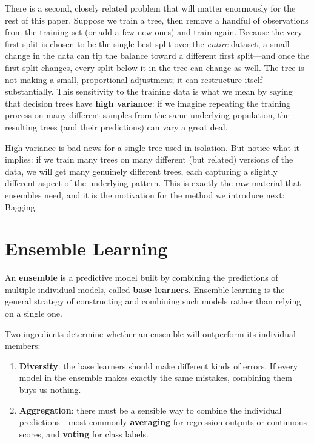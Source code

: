 \documentclass[12pt,a4paper]{article}
\begin{document}
There is a second, closely related problem that will matter enormously for the rest of this paper. Suppose we train a tree, then remove a handful of observations from the training set (or add a few new ones) and train again. Because the very first split is chosen to be the single best split over the \emph{entire} dataset, a small change in the data can tip the balance toward a different first split---and once the first split changes, every split below it in the tree can change as well. The tree is not making a small, proportional adjustment; it can restructure itself substantially. This sensitivity to the training data is what we mean by saying that decision trees have \textbf{high variance}: if we imagine repeating the training process on many different samples from the same underlying population, the resulting trees (and their predictions) can vary a great deal.

High variance is bad news for a single tree used in isolation. But notice what it implies: if we train many trees on many different (but related) versions of the data, we will get many genuinely different trees, each capturing a slightly different aspect of the underlying pattern. This is exactly the raw material that ensembles need, and it is the motivation for the method we introduce next: Bagging.

\section{Ensemble Learning}

An \textbf{ensemble} is a predictive model built by combining the predictions of multiple individual models, called \textbf{base learners}. Ensemble learning is the general strategy of constructing and combining such models rather than relying on a single one.

Two ingredients determine whether an ensemble will outperform its individual members:

\begin{enumerate}[nosep]
    \item \textbf{Diversity}: the base learners should make different kinds of errors. If every model in the ensemble makes exactly the same mistakes, combining them buys us nothing.
    \item \textbf{Aggregation}: there must be a sensible way to combine the individual predictions---most commonly \textbf{averaging} for regression outputs or continuous scores, and \textbf{voting} for class labels.
\end{enumerate}
\end{document}
